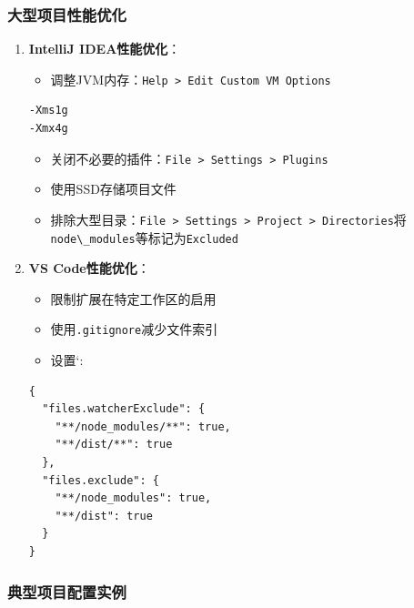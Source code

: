\subsubsection{大型项目性能优化}\label{ux5927ux578bux9879ux76eeux6027ux80fdux4f18ux5316}

\begin{enumerate}
\def\labelenumi{\arabic{enumi}.}
\tightlist
\item
  \textbf{IntelliJ IDEA性能优化}：

  \begin{itemize}
  \tightlist
  \item
    调整JVM内存：\passthrough{\lstinline!Help > Edit Custom VM Options!}
  \end{itemize}

\begin{lstlisting}
-Xms1g
-Xmx4g
\end{lstlisting}

  \begin{itemize}
  \tightlist
  \item
    关闭不必要的插件：\passthrough{\lstinline!File > Settings > Plugins!}
  \item
    使用SSD存储项目文件
  \item
    排除大型目录：\passthrough{\lstinline!File > Settings > Project > Directories!}将\passthrough{\lstinline!node\_modules!}等标记为\passthrough{\lstinline!Excluded!}
  \end{itemize}
\item
  \textbf{VS Code性能优化}：

  \begin{itemize}
  \tightlist
  \item
    限制扩展在特定工作区的启用
  \item
    使用\passthrough{\lstinline!.gitignore!}减少文件索引
  \item
    设置`:
  \end{itemize}

\begin{lstlisting}
{
  "files.watcherExclude": {
    "**/node_modules/**": true,
    "**/dist/**": true
  },
  "files.exclude": {
    "**/node_modules": true,
    "**/dist": true
  }
}
\end{lstlisting}
\end{enumerate}

\subsubsection{典型项目配置实例}\label{ux5178ux578bux9879ux76eeux914dux7f6eux5b9eux4f8b}

